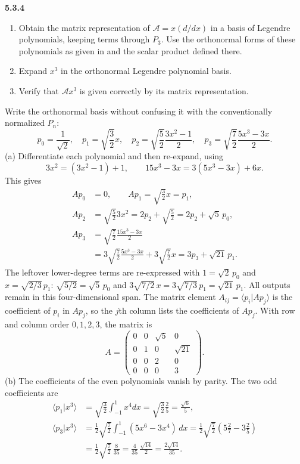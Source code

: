 \par\bigskip
\noindent\textbf{5.3.4}\quad
\begin{enumerate}
\item[(a)] Obtain the matrix representation of $\mathcal{A}=x(d/dx)$ in a
  basis of Legendre polynomials, keeping terms through $P_{3}$. Use the
  orthonormal forms of these polynomials as given in  and the scalar
  product defined there.
\item[(b)] Expand $x^{3}$ in the orthonormal Legendre polynomial basis.
\item[(c)] Verify that $\mathcal{A}x^{3}$ is given correctly by its matrix
  representation.
\end{enumerate}
\solution
{}
Write the orthonormal basis without confusing it with the conventionally
normalized $P_n$:
\[
p_0=\frac1{\sqrt2},\quad p_1=\sqrt{\frac32}x,\quad
p_2=\sqrt{\frac52}\frac{3x^2-1}{2},\quad
p_3=\sqrt{\frac72}\frac{5x^3-3x}{2}.
\]
(a) Differentiate each polynomial and then re-expand, using
\[
3x^2=(3x^2-1)+1,\qquad 15x^3-3x=3(5x^3-3x)+6x.
\]
This gives
\begin{align*}
Ap_0&=0,\qquad Ap_1=\sqrt{\frac32}x=p_1,\\
Ap_2&=\sqrt{\frac52}3x^2
=2p_2+\sqrt{\frac52}=2p_2+\sqrt5\,p_0,\\
Ap_3&=\sqrt{\frac72}\frac{15x^3-3x}{2}\\
&=3\sqrt{\frac72}\frac{5x^3-3x}{2}
 +3\sqrt{\frac72}x
=3p_3+\sqrt{21}\,p_1.
\end{align*}
The leftover lower-degree terms are re-expressed with $1=\sqrt2\,p_0$ and
$x=\sqrt{2/3}\,p_1$: $\sqrt{5/2}=\sqrt5\,p_0$ and
$3\sqrt{7/2}\,x=3\sqrt{7/3}\,p_1=\sqrt{21}\,p_1$.
All outputs remain in this four-dimensional span. The matrix element
$A_{ij}=\langle p_i|Ap_j\rangle$ is the coefficient of $p_i$ in $Ap_j$, so
the $j$th column lists the coefficients of $Ap_j$. With row and column
order $0,1,2,3$, the matrix is
\[
\boxed{A=\begin{pmatrix}
0&0&\sqrt5&0\\0&1&0&\sqrt{21}\\0&0&2&0\\0&0&0&3
\end{pmatrix}}.
\]
(b) The coefficients of the even polynomials vanish by parity. The two
odd coefficients are
\begin{align*}
\langle p_1|x^3\rangle
&=\sqrt{\frac32}\int_{-1}^1x^4dx
=\sqrt{\frac32}\frac25=\frac{\sqrt6}{5},\\
\langle p_3|x^3\rangle
&=\frac12\sqrt{\frac72}\int_{-1}^1(5x^6-3x^4)\,dx
=\frac12\sqrt{\frac72}\left(5\frac27-3\frac25\right)\\
&=\frac12\sqrt{\frac72}\,\frac8{35}
=\frac4{35}\,\frac{\sqrt{14}}2=\frac{2\sqrt{14}}{35}.
\end{align*}
